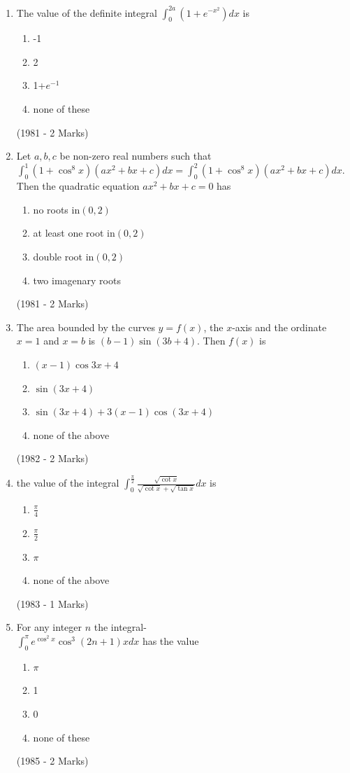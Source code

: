 \documentclass[journal,12pt,twocolumn]{IEEEtran}
\theoremstyle{remark}
\begin{document}
\begin{enumerate}
	\item The value of the definite integral $\int_0^{2a}(1+e^{-x^2})dx$ is\\
		\begin{enumerate}
	\item -1            
	\item  2
	\item  1+$e^{-1}$     
	\item  none of these
		\end{enumerate}
		\hfill{(1981 - 2 Marks)}
	\item Let $a,b,c$ be non-zero real numbers such that $\int_0^1 (1+ \cos ^8 x)(ax^2 + bx +c)dx = \int_0^2 (1+ \cos^8 x)(ax^2+bx+c)dx.$\\
		Then the quadratic equation $ax^2+bx+c=0$ has
		
		\begin{enumerate}
	\item no roots in$ (0,2)$
	\item at least one root in$ (0,2)$
	\item double root in$ (0,2)  $
	\item two imagenary roots
\end{enumerate}
		\hfill{(1981 - 2 Marks)}
	\item The area bounded by the curves $y=f(x)$, the $x$-axis and the ordinate $x=1$ and $x=b$ is $(b-1) \sin (3b+4)$. Then $f(x)$ is 

		
		\begin{enumerate}
			\item$(x-1) \cos {3x+4}$
			\item$\sin {(3x+4)}$
			\item$\sin {(3x+4)}+3(x-1) \cos {(3x+4)}$
			\item none of the above
		\end{enumerate}
		\hfill{(1982 - 2 Marks)}
	\item the value of the integral $\int_0^{\frac{\pi}{2}} \frac{\sqrt{\cot x}}{\sqrt{\cot x}+\sqrt{\tan x}}dx$ is 

		\begin{enumerate}
			\item $\frac{\pi}{4}$
		\item$\frac{\pi}{2}$
			\item$\pi$
		\item none of the above
		\end{enumerate}
		\hfill{(1983 - 1 Marks)}
	\item For any integer $n$ the integral-\\
		$\int_0^{\pi} e^{\cos^2 x} \cos ^3 {(2n+1)}xdx$ has the value

		\begin{enumerate}
			\item	$\pi$
			\item 1
			\item 0
			\item none of these
		\end{enumerate}
		\hfill{(1985 - 2 Marks)}
\end{enumerate}

    
\end{document}
